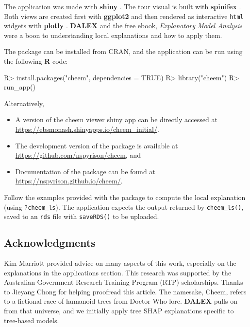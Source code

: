 \documentclass[
]{jss}
\providecommand{\tightlist}{%
  \setlength{\itemsep}{0pt}\setlength{\parskip}{0pt}}
\begin{document}
The application was made with \textbf{shiny} \citep{chang_shiny_2021}.
The tour visual is built with \textbf{spinifex}
\citep{spyrison_spinifex_2020}. Both views are created first with
\textbf{ggplot2} \citep{wickham_ggplot2_2016} and then rendered as
interactive \texttt{html} widgets with \textbf{plotly}
\citep{sievert_interactive_2020}. \textbf{DALEX}
\citep{biecek_dalex_2018} and the free ebook, \emph{Explanatory Model
Analysis} \citep{biecek_explanatory_2021} were a boon to understanding
local explanations and how to apply them.

The package can be installed from CRAN, and the application can be run
using the following \textbf{R} code:

\begin{CodeChunk}
\begin{CodeInput}
R> install.packages("cheem", dependencies = TRUE)
R> library("cheem")
R> run_app()
\end{CodeInput}
\end{CodeChunk}

Alternatively,

\begin{itemize}
\tightlist
\item
  A version of the cheem viewer shiny app can be directly accessed at
  \url{https://ebsmonash.shinyapps.io/cheem_initial/}.
\item
  The development version of the package is available at
  \url{https://github.com/nspyrison/cheem}, and
\item
  Documentation of the package can be found at
  \url{https://nspyrison.github.io/cheem/}.
\end{itemize}

Follow the examples provided with the package to compute the local
explanation (using \texttt{?cheem\_ls}). The application expects the
output returned by \texttt{cheem\_ls()}, saved to an \texttt{rds} file
with \texttt{saveRDS()} to be uploaded.

\hypertarget{acknowledgments}{%
\subsection*{Acknowledgments}\label{acknowledgments}}

Kim Marriott provided advice on many aspects of this work, especially on
the explanations in the applications section. This research was
supported by the Australian Government Research Training Program (RTP)
scholarships. Thanks to Jieyang Chong for helping proofread this
article. The namesake, Cheem, refers to a fictional race of humanoid
trees from Doctor Who lore. \textbf{DALEX} pulls on from that universe,
and we initially apply tree SHAP explanations specific to tree-based
models.

\renewcommand\refname{References}

\end{document}
